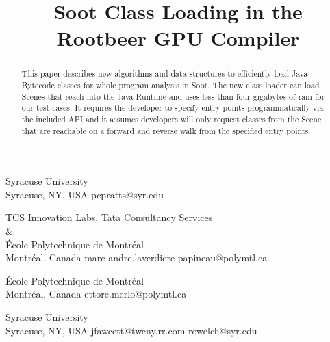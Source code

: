 \documentclass[preprint]{sigplanconf}
\begin{document}
\copyrightdata{[to be supplied]} 


\title{Soot Class Loading in the Rootbeer GPU Compiler}

           {Syracuse University\\Syracuse, NY, USA}
           {pcpratts@syr.edu}

           {TCS Innovation Labs, Tata Consultancy Services\\\&\\
			École Polytechnique de Montréal\\
			Montréal, Canada}
           {marc-andre.laverdiere-papineau@polymtl.ca}
           
           {École Polytechnique de Montréal\\
			Montréal, Canada}
           {ettore.merlo@polymtl.ca}           
           
           {Syracuse University\\Syracuse, NY, USA}
           {jfawcett@twcny.rr.com rowelch@syr.edu}        
                      
           

\maketitle

\begin{abstract}

This paper describes new algorithms and data structures to efficiently load Java Bytecode classes for whole program analysis in Soot. The new class loader can load Scenes that reach into the Java Runtime and uses less than four gigabytes of ram for our test cases. It requires the developer to specify entry points programmatically via the included API and it assumes developers will only request classes from the Scene that are reachable on a forward and reverse walk from the specified entry points.
\end{abstract}
\end{document}
